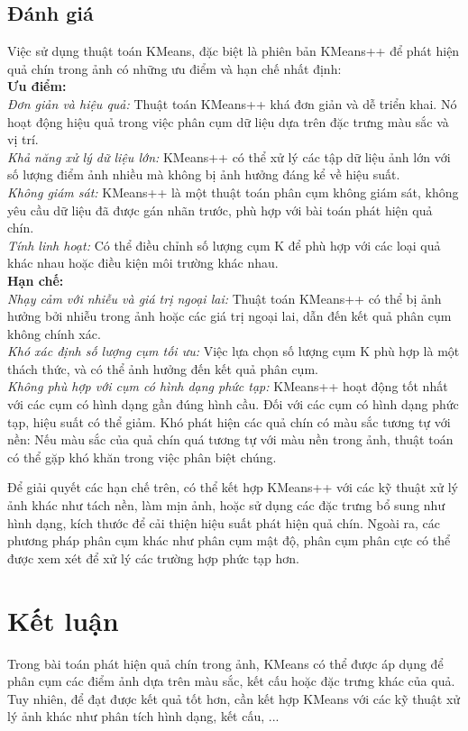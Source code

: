 \documentclass[a4paper]{article}
\begin{document}
\newpage
\subsection{Đánh giá}
Việc sử dụng thuật toán KMeans, đặc biệt là phiên bản KMeans++ để phát hiện quả chín trong ảnh có những ưu điểm và hạn chế nhất định: \\
\textbf{Ưu điểm:} \\
\textit{Đơn giản và hiệu quả:} Thuật toán KMeans++ khá đơn giản và dễ triển khai. Nó hoạt động hiệu quả trong việc phân cụm dữ liệu dựa trên đặc trưng màu sắc và vị trí. \\
\textit{Khả năng xử lý dữ liệu lớn:} KMeans++ có thể xử lý các tập dữ liệu ảnh lớn với số lượng điểm ảnh nhiều mà không bị ảnh hưởng đáng kể về hiệu suất. \\
\textit{Không giám sát: }KMeans++ là một thuật toán phân cụm không giám sát, không yêu cầu dữ liệu đã được gán nhãn trước, phù hợp với bài toán phát hiện quả chín.\\ 
\textit{Tính linh hoạt:} Có thể điều chỉnh số lượng cụm K để phù hợp với các loại quả khác nhau hoặc điều kiện môi trường khác nhau. \\
\textbf{Hạn chế:} \\
\textit{Nhạy cảm với nhiễu và giá trị ngoại lai:} Thuật toán KMeans++ có thể bị ảnh hưởng bởi nhiễu trong ảnh hoặc các giá trị ngoại lai, dẫn đến kết quả phân cụm không chính xác. \\
\textit{Khó xác định số lượng cụm tối ưu:} Việc lựa chọn số lượng cụm K phù hợp là một thách thức, và có thể ảnh hưởng đến kết quả phân cụm. \\
\textit{Không phù hợp với cụm có hình dạng phức tạp:} KMeans++ hoạt động tốt nhất với các cụm có hình dạng gần đúng hình cầu. Đối với các cụm có hình dạng phức tạp, hiệu suất có thể giảm.
Khó phát hiện các quả chín có màu sắc tương tự với nền: Nếu màu sắc của quả chín quá tương tự với màu nền trong ảnh, thuật toán có thể gặp khó khăn trong việc phân biệt chúng. 

Để giải quyết các hạn chế trên, có thể kết hợp KMeans++ với các kỹ thuật xử lý ảnh khác như tách nền, làm mịn ảnh, hoặc sử dụng các đặc trưng bổ sung như hình dạng, kích thước để cải thiện hiệu suất phát hiện quả chín. Ngoài ra, các phương pháp phân cụm khác như phân cụm mật độ, phân cụm phân cực có thể được xem xét để xử lý các trường hợp phức tạp hơn.

\section{Kết luận}
Trong bài toán phát hiện quả chín trong ảnh, KMeans có thể được áp dụng để
phân cụm các điểm ảnh dựa trên màu sắc, kết cấu hoặc đặc trưng khác của quả. Tuy
nhiên, để đạt được kết quả tốt hơn, cần kết hợp KMeans với các kỹ thuật xử lý ảnh
khác như phân tích hình dạng, kết cấu, ...
\end{document}
